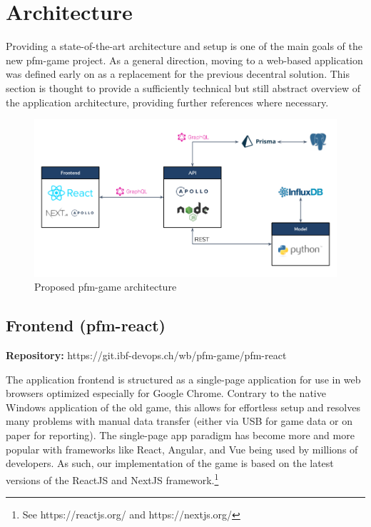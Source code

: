 \section{Architecture}
\label{sec:architecture}

Providing a state-of-the-art architecture and setup is one of the main goals of the new pfm-game project. As a general direction, moving to a web-based application was defined early on as a replacement for the previous decentral solution. This section is thought to provide a sufficiently technical but still abstract overview of the application architecture, providing further references where necessary.

\begin{figure}[h!]
  \centering
  \includegraphics[scale=0.45]{img/architecture.png}
  \caption{Proposed pfm-game architecture}
\end{figure}


\subsection{Frontend (pfm-react)}
\begin{flushright}
  \textbf{Repository:} https://git.ibf-devops.ch/wb/pfm-game/pfm-react
\end{flushright}

The application frontend is structured as a single-page application for use in web browsers optimized especially for Google Chrome. Contrary to the native Windows application of the old game, this allows for effortless setup and resolves many problems with manual data transfer (either via USB for game data or on paper for reporting). The single-page app paradigm has become more and more popular with frameworks like React, Angular, and Vue being used by millions of developers. As such, our implementation of the game is based on the latest versions of the ReactJS and NextJS framework.\footnote{See https://reactjs.org/ and https://nextjs.org/}


